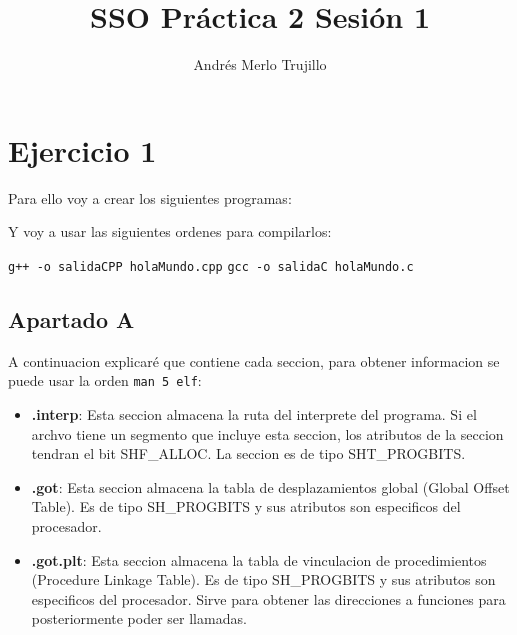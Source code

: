\documentclass{article}
\title{SSO Práctica 2 Sesión 1}
\author{Andrés Merlo Trujillo}
\date{}
\begin{document}
\maketitle

\tableofcontents

\newpage

\section*{Ejercicio 1}

Para ello voy a crear los siguientes programas:



Y voy a usar las siguientes ordenes para compilarlos:

\verb|g++ -o salidaCPP holaMundo.cpp|
\verb|gcc -o salidaC holaMundo.c|


\subsection*{Apartado A}
A continuacion explicaré que contiene cada seccion, para obtener informacion se puede usar la orden \verb|man 5 elf|:

\begin{itemize}
    \item \textbf{.interp}: Esta seccion almacena la ruta del interprete del programa. Si el archvo tiene un segmento que incluye esta seccion, los atributos de la seccion tendran el bit SHF\_ALLOC. La seccion es de tipo SHT\_PROGBITS.
    
    \item \textbf{.got}: Esta seccion almacena la tabla de desplazamientos global (Global Offset Table). Es de tipo SH\_PROGBITS y sus atributos son especificos del procesador. 
    
    \item \textbf{.got.plt}: Esta seccion almacena la tabla de vinculacion de procedimientos (Procedure Linkage Table). Es de tipo SH\_PROGBITS y sus atributos son especificos del procesador. Sirve para obtener las direcciones a funciones para posteriormente poder ser llamadas.
\end{itemize}
\end{document}
